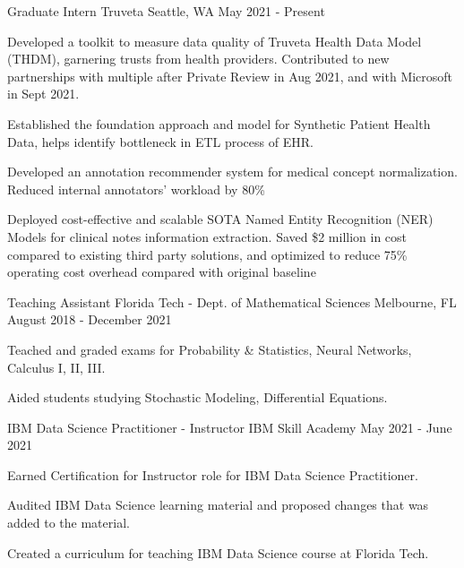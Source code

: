 \begin{cventries}

	\cventry
	{Graduate Intern}
	{Truveta}
	{Seattle, WA}
	{May 2021 - Present}
	{\begin{cvitems}
			\item {Developed a toolkit to measure data quality of Truveta Health Data Model (THDM), garnering trusts from health providers. Contributed to new partnerships with multiple after Private Review in Aug 2021, and with Microsoft in Sept 2021.}
			\item {Established the foundation approach and model for Synthetic Patient Health Data, helps identify bottleneck in ETL process of EHR.}
			\item {Developed an annotation recommender system for medical concept normalization. Reduced internal annotators' workload by 80\%}
			\item {Deployed cost-effective and scalable SOTA Named Entity Recognition (NER) Models for clinical notes information extraction. Saved \$2 million in cost compared to existing third party solutions, and optimized to reduce 75\% operating cost overhead compared with original baseline}
		\end{cvitems}}
	\cventry
	{Teaching Assistant}
	{Florida Tech - Dept. of Mathematical Sciences}
	{Melbourne, FL}
	{August 2018 - December 2021}
	{\begin{cvitems}
			\item {Teached and graded exams for Probability \& Statistics, Neural Networks, Calculus I, II, III.}
			\item {Aided students studying Stochastic Modeling, Differential Equations.}
		\end{cvitems}}
	\cventry
	{IBM Data Science Practitioner - Instructor}
	{IBM Skill Academy}
	{}
	{May 2021 - June 2021}
	{\begin{cvitems}
			\item {Earned Certification for Instructor role for IBM Data Science Practitioner.}
			\item {Audited IBM Data Science learning material and proposed changes that was added to the material.}
			\item {Created a curriculum for teaching IBM Data Science course at Florida Tech.}
		\end{cvitems}}
\end{cventries}
\vspace{-4mm}
